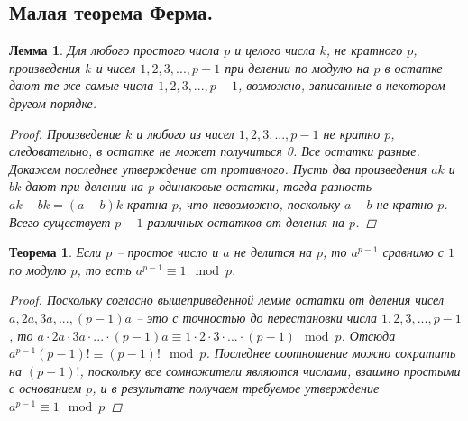 \documentclass{article}
\newtheorem{theorem}{Теорема}
\newtheorem{lemma}{Лемма}
\begin{document}
\subsection{Малая теорема Ферма.}
\begin{lemma}
Для любого простого числа $p$ и целого числа $k$, не кратного $p$, произведения $k$ и чисел $1,2,3,...,p-1$ при делении по модулю на $p$ в остатке дают те же самые числа $1,2,3,...,p-1$, возможно, записанные в некотором другом порядке.
\begin{proof}
Произведение $k$ и любого из чисел $1,2,3,...,p-1$ не кратно $p$, следовательно, в остатке не может получиться 0. Все остатки разные. Докажем последнее утверждение от противного. Пусть два произведения $ak$ и $bk$ дают при делении на $p$ одинаковые остатки, тогда разность $ak - bk = (a - b)k$ кратна $p$, что невозможно, поскольку $a - b$ не кратно $p$. Всего существует $p-1$ различных остатков от деления на $p$.
\end{proof}
\end{lemma}
\begin{theorem}
Если $p$ -- простое число и $a$ не делится на $p$, то $a^{p-1}$ сравнимо с $1$ по модулю $p$, то есть $a^{p-1} \equiv 1 \mod{p}$.
\begin{proof}
Поскольку согласно вышеприведенной лемме остатки от деления чисел $a, 2a, 3a, ..., (p-1)a$ -- это с точностью до перестановки числа $1,2,3,...,p-1$, то $a \cdot 2a \cdot 3a \cdot ... \cdot (p-1)a \equiv 1 \cdot 2 \cdot 3 \cdot ... \cdot (p-1) \mod{p}$. Отсюда $a^{p-1}(p-1)! \equiv (p-1)! \mod{p}$. Последнее соотношение можно сократить на $(p-1)!$, поскольку все сомножители являются числами, взаимно простыми с основанием $p$, и в результате получаем требуемое утверждение $a^{p-1} \equiv 1 \mod{p}$
\end{proof}
\end{theorem}
\end{document}
